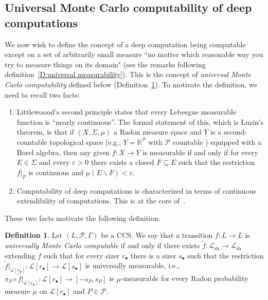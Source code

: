 \documentclass[psamsfonts]{amsart}
\theoremstyle{definition}
\newtheorem{defn}[thm]{Definition}
\theoremstyle{remark}
\numberwithin{equation}{section}
\begin{document}
\subsection{Universal Monte Carlo computability of  deep computations}

We now wish to define the concept of a deep computation being computable except on a set of arbitrarily small measure ``no matter which reasonable way you try to measure things on its domain"  (see the remarks following definition~\ref{D:universal measurability}).
This is the concept of \emph{universal Monte Carlo computability} defined below (Definition~\ref{D:universally essentially computable}).
To motivate the definition, we need to recall two facts:

\begin{enumerate}
\item
Littlewoood's second principle states that every Lebesgue measurable function is ``nearly continuous''.
The formal statement of this, which is Luzin's theorem, is that if
 $(X,\Sigma ,\mu )$  a Radon measure space and $Y$ is a second-countable topological space (e.g., $Y=\mathbb{R}^\mathcal{P}$ with $\mathcal{P}$ countable ) equipped with a Borel algebra, then any given $f:X\to Y$ is measurable if and only if for every  $E\in\Sigma$ and every $\varepsilon>0$ there exists a closed $F\subseteq E$ such that the restriction $f|_F$ is continuous and $\mu(E\backslash F) < \varepsilon$.
\item
Computability of deep computations is characterized in terms of continuous extendibility of computations.
This is at the core of~\cite{alva2024approximability}.
\end{enumerate}


These two facts motivate the following definition:


\begin{defn}
\label{D:universally essentially computable}
    Let $(L,\mathcal{P},\Gamma)$ be a CCS.
We say that a transition $f:L\rightarrow L$ is \emph{universally Monte Carlo computable} if and only if there exists $\tilde f:\mathcal{L}_{\text{sh}}\rightarrow \mathcal{L}_{\text{sh}}$ extending $f$ such that for every sizer $r_\bullet$ there is a sizer $s_\bullet$ such that the restriction $\tilde f|_{\mathcal{L}[r_{\bullet}]}:\mathcal{L}[r_\bullet]\rightarrow\mathcal{L}[s_\bullet]$ is universally measurable, i.e., $\pi_P\circ \tilde f|_{\mathcal{L}[r_{\bullet}]}:\mathcal{L}[r_\bullet]\rightarrow [-s_P,s_P]$ is $\mu$-measurable for every Radon probability measure $\mu$ on $\mathcal{L}[r_\bullet]$ and $P\in\mathcal{P}$.
\end{defn}
\end{document}
